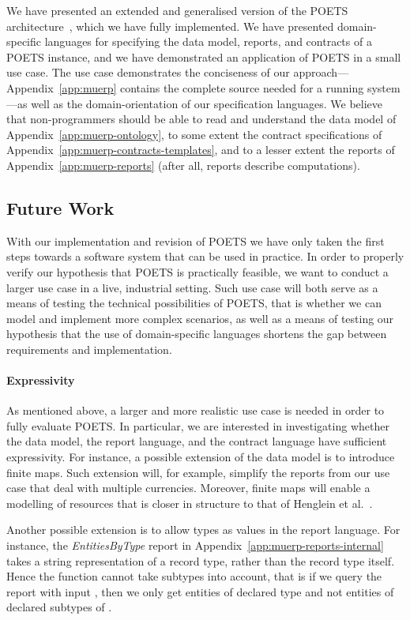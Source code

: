 We have presented an extended and generalised version of the POETS
architecture~\cite{henglein09jlap}, which we have fully
implemented. We have presented domain-specific languages for
specifying the data model, reports, and contracts of a POETS instance,
and we have demonstrated an application of POETS in a small use
case. The use case demonstrates the conciseness of our
approach---Appendix~\ref{app:muerp} contains the complete source
needed for a running system---as well as the domain-orientation
of our specification languages. We believe that non-programmers should
be able to read and understand the data model of
Appendix~\ref{app:muerp-ontology}, to some extent the contract
specifications of Appendix~\ref{app:muerp-contracts-templates}, and to
a lesser extent the reports of Appendix~\ref{app:muerp-reports} (after all,
reports describe computations).

\subsection{Future Work}
\label{sec:future-work}

With our implementation and revision of POETS we have only taken the
first steps towards a software system that can be used in practice. In
order to properly verify our hypothesis that POETS is practically
feasible, we want to conduct a larger use case in a live, industrial
setting. Such use case will both serve as a means of testing the
technical possibilities of POETS, that is whether we can model and
implement more complex scenarios, as well as a means of testing our
hypothesis that the use of domain-specific languages shortens the gap
between requirements and implementation.

\paragraph{Expressivity}
As mentioned above, a larger and more realistic use case is needed in
order to fully evaluate POETS. In particular, we are interested in
investigating whether the data model, the report language, and the
contract language have sufficient expressivity. For instance, a
possible extension of the data model is to introduce finite maps. Such
extension will, for example, simplify the reports from our \muerp use
case that deal with multiple currencies. Moreover, finite maps will
enable a modelling of resources that is closer in structure to that
of Henglein et al.~\cite{henglein09jlap}.

Another possible extension is to allow types as values in the report
language. For instance, the \emph{EntitiesByType} report in
Appendix~\ref{app:muerp-reports-internal} takes a string
representation of a record type, rather than the record type
itself. Hence the function cannot take subtypes into account, that is
if we query the report with input , then we only get
entities of declared type  and not entities of declared
subtypes of .

